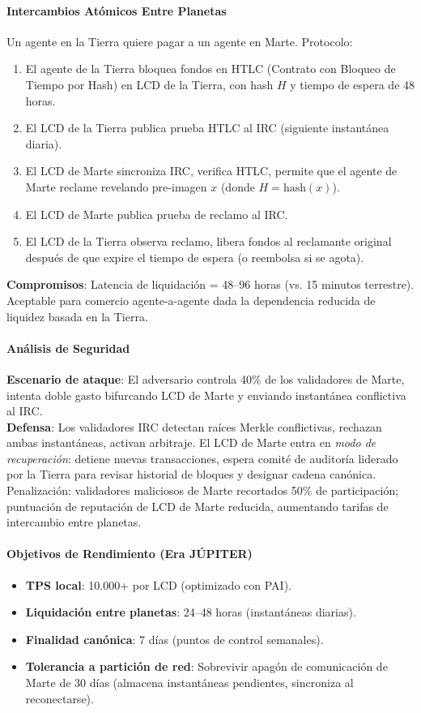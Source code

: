 \documentclass[11pt]{article}
\begin{document}
\paragraph{Intercambios Atómicos Entre Planetas}
Un agente en la Tierra quiere pagar a un agente en Marte. Protocolo:
\begin{enumerate}[noitemsep]
  \item El agente de la Tierra bloquea fondos en HTLC (Contrato con Bloqueo de Tiempo por Hash) en LCD de la Tierra, con hash $H$ y tiempo de espera de 48 horas.
  \item El LCD de la Tierra publica prueba HTLC al IRC (siguiente instantánea diaria).
  \item El LCD de Marte sincroniza IRC, verifica HTLC, permite que el agente de Marte reclame revelando pre-imagen $x$ (donde $H = \text{hash}(x)$).
  \item El LCD de Marte publica prueba de reclamo al IRC.
  \item El LCD de la Tierra observa reclamo, libera fondos al reclamante original después de que expire el tiempo de espera (o reembolsa si se agota).
\end{enumerate}
\textbf{Compromisos}: Latencia de liquidación = 48--96 horas (vs. 15 minutos terrestre). Aceptable para comercio agente-a-agente dada la dependencia reducida de liquidez basada en la Tierra.

\paragraph{Análisis de Seguridad}
\textbf{Escenario de ataque}: El adversario controla 40\% de los validadores de Marte, intenta doble gasto bifurcando LCD de Marte y enviando instantánea conflictiva al IRC.\\
\textbf{Defensa}: Los validadores IRC detectan raíces Merkle conflictivas, rechazan ambas instantáneas, activan arbitraje. El LCD de Marte entra en \emph{modo de recuperación}: detiene nuevas transacciones, espera comité de auditoría liderado por la Tierra para revisar historial de bloques y designar cadena canónica. Penalización: validadores maliciosos de Marte recortados 50\% de participación; puntuación de reputación de LCD de Marte reducida, aumentando tarifas de intercambio entre planetas.

\paragraph{Objetivos de Rendimiento (Era JÚPITER)}
\begin{itemize}[noitemsep]
  \item \textbf{TPS local}: 10.000+ por LCD (optimizado con PAI).
  \item \textbf{Liquidación entre planetas}: 24--48 horas (instantáneas diarias).
  \item \textbf{Finalidad canónica}: 7 días (puntos de control semanales).
  \item \textbf{Tolerancia a partición de red}: Sobrevivir apagón de comunicación de Marte de 30 días (almacena instantáneas pendientes, sincroniza al reconectarse).
\end{itemize}
\end{document}
